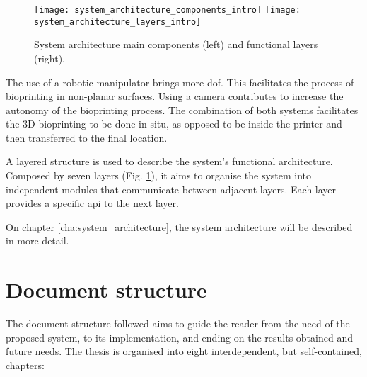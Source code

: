 \begin{figure}[htbp]
	\centering
	\texttt{[image: system\_architecture\_components\_intro]}
	\hspace{0.1in}
	\texttt{[image: system\_architecture\_layers\_intro]}
	\caption{System architecture main components (left) and functional layers (right).}
	\label{fig:system_architecture_intro}
\end{figure}

The use of a robotic manipulator brings more \gls{dof}. This facilitates the process of bioprinting in non-planar surfaces. Using a camera contributes to increase the autonomy of the bioprinting process. The combination of both systems facilitates the 3D bioprinting to be done in situ, as opposed to be inside the printer and then transferred to the final location.

A layered structure is used to describe the system's functional architecture. Composed by seven layers (Fig. \ref{fig:system_architecture_intro}), it aims to organise the system into independent modules that communicate between adjacent layers. Each layer provides a specific \gls{api} to the next layer.

On chapter \ref{cha:system_architecture}, the system architecture will be described in more detail.


\section{Document structure}
\label{sec:document_structure}

The document structure followed aims to guide the reader from the need of the proposed system, to its implementation, and ending on the results obtained and future needs. The thesis is organised into eight interdependent, but self-contained, chapters:

